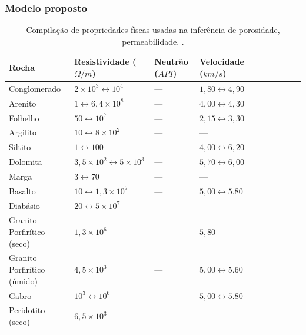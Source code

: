 \documentclass[10pt]{beamer} %
\begin{document}
\begin{frame}
	\frametitle{Modelo proposto}
	\begin{scriptsize}
		\begin{table}[H]
			\centering
			\caption{Compilação de propriedades físcas usadas na inferência de porosidade, permeabilidade. \cite{Telford_1993}.}
			\label{rock-properties2}
			\begin{tabular}{@{}llllllllll@{}}
				\toprule
				Rocha   & Resistividade ($\Omega/m$) &  Neutrão ($API$) & Velocidade ($km/s$)  &    \\ \midrule
				Conglomerado &    $2\times10^{3}\leftrightarrow10^{4}$       &    ---           &     $1,80\leftrightarrow4,90$       &     \\
				Arenito  &    $1\leftrightarrow6,4\times10^{8}$       &      ---         &     $4,00\leftrightarrow4,30$       &   \\
				Folhelho &     $50\leftrightarrow10^{7}$      &      ---         &      $2,15\leftrightarrow3,30$      &   \\
				Argilito &     $10\leftrightarrow8\times10^{2}$      &       ---        &     ---       &      \\
				Siltito  &      $1\leftrightarrow100$     &      ---         &         $4,00\leftrightarrow6,20$    &         \\
				Dolomita &   $3,5\times10^{2}\leftrightarrow5\times10^{3}$        &    ---           &      $5,70\leftrightarrow6,00$      &      \\
				Marga  &     $3\leftrightarrow70$      &     ---          &     ---       &     \\
				Basalto  &     $10\leftrightarrow1,3\times10^{7}$      &     ---          &     $ 5,00\leftrightarrow5.80$         &     \\
				Diabásio &  $20\leftrightarrow5\times10^{7}$         &      ---         &     ---       &  \\
				Granito Porfirítico (seco) &     $1,3\times10^{6}$     &       ---        &     $5,80$       &    \\
				Granito Porfirítico (úmido) &  $4,5\times10^{3}$          &      ---         &     $ 5,00\leftrightarrow5.60$         &      \\
				Gabro &   $10^{3}\leftrightarrow10^{6}$       &      ---         &      $ 5,00\leftrightarrow5.80$        &     \\
				Peridotito (seco) &   $6,5\times10^{3}$        &    ---           &       ---     &    \\

\end{tabular}
\end{table}
\end{scriptsize}
\end{frame}
\end{document}
